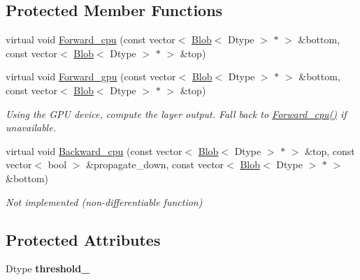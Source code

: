 \subsection*{Protected Member Functions}
\begin{DoxyCompactItemize}
\item 
virtual void \hyperlink{classcaffe_1_1ThresholdLayer_a57d3757107bc9b21379dc56b4f96643e}{Forward\+\_\+cpu} (const vector$<$ \hyperlink{classcaffe_1_1Blob}{Blob}$<$ Dtype $>$ $\ast$ $>$ \&bottom, const vector$<$ \hyperlink{classcaffe_1_1Blob}{Blob}$<$ Dtype $>$ $\ast$ $>$ \&top)
\item 
virtual void \hyperlink{classcaffe_1_1ThresholdLayer_ae364101c13558996e4923bbb249504c7}{Forward\+\_\+gpu} (const vector$<$ \hyperlink{classcaffe_1_1Blob}{Blob}$<$ Dtype $>$ $\ast$ $>$ \&bottom, const vector$<$ \hyperlink{classcaffe_1_1Blob}{Blob}$<$ Dtype $>$ $\ast$ $>$ \&top)\hypertarget{classcaffe_1_1ThresholdLayer_ae364101c13558996e4923bbb249504c7}{}\label{classcaffe_1_1ThresholdLayer_ae364101c13558996e4923bbb249504c7}

\begin{DoxyCompactList}\small\item\em Using the G\+PU device, compute the layer output. Fall back to \hyperlink{classcaffe_1_1ThresholdLayer_a57d3757107bc9b21379dc56b4f96643e}{Forward\+\_\+cpu()} if unavailable. \end{DoxyCompactList}\item 
virtual void \hyperlink{classcaffe_1_1ThresholdLayer_aa0da8e40847b007faa4e84cc1047e38b}{Backward\+\_\+cpu} (const vector$<$ \hyperlink{classcaffe_1_1Blob}{Blob}$<$ Dtype $>$ $\ast$ $>$ \&top, const vector$<$ bool $>$ \&propagate\+\_\+down, const vector$<$ \hyperlink{classcaffe_1_1Blob}{Blob}$<$ Dtype $>$ $\ast$ $>$ \&bottom)\hypertarget{classcaffe_1_1ThresholdLayer_aa0da8e40847b007faa4e84cc1047e38b}{}\label{classcaffe_1_1ThresholdLayer_aa0da8e40847b007faa4e84cc1047e38b}

\begin{DoxyCompactList}\small\item\em Not implemented (non-\/differentiable function) \end{DoxyCompactList}\end{DoxyCompactItemize}
\subsection*{Protected Attributes}
\begin{DoxyCompactItemize}
\item 
Dtype {\bfseries threshold\+\_\+}\hypertarget{classcaffe_1_1ThresholdLayer_aacbdfb31f685add4d4c9dbfb5444bcad}{}\label{classcaffe_1_1ThresholdLayer_aacbdfb31f685add4d4c9dbfb5444bcad}

\end{DoxyCompactItemize}


